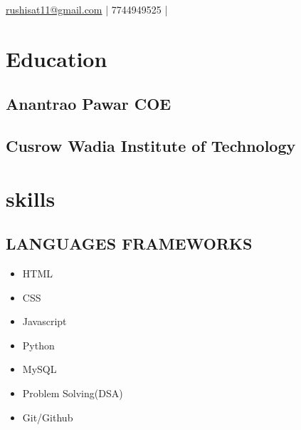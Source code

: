 \documentclass[letterpaper]{deedy-resume} %
\begin{document}


{\href{mailto:rushisat11@gmail.com}{rushisat11@gmail.com} | 7744949525 | {\href{https://www.linkedin.com/in/rushikesh-mallanath/}{}}}


\begin{minipage}[t]{0.33\textwidth} %


\section{Education} 

\subsection{Anantrao Pawar COE}
\sectionspace %

\subsection{Cusrow Wadia Institute of Technology}
\sectionspace %
\sectionspace


\section{skills}
\sectionspace 
\subsection{LANGUAGES FRAMEWORKS}
\begin{itemize}
\item HTML
\item CSS
\item Javascript
\item Python
\item MySQL
\item Problem Solving(DSA)
\item Git/Github
\end{itemize}


\end{minipage}
\end{document}

